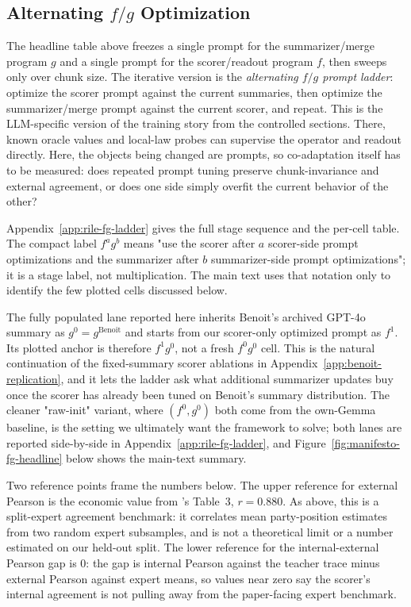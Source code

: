 \subsection[Alternating f/g Optimization]{Alternating $f/g$ Optimization}\label{sec:rile-fg-ladder}

The headline table above freezes a single prompt for the summarizer/merge
program $g$ and a single prompt for the scorer/readout program $f$, then
sweeps only over chunk size. The iterative version is the
\emph{alternating $f/g$ prompt ladder}: optimize the scorer prompt against
the current summaries, then optimize the summarizer/merge prompt against
the current scorer, and repeat. This is the LLM-specific version of the
training story from the controlled sections. There, known oracle values
and local-law probes can supervise the operator and readout directly.
Here, the objects being changed are prompts, so co-adaptation itself has
to be measured: does repeated prompt tuning preserve chunk-invariance and
external agreement, or does one side simply overfit the current behavior
of the other?

Appendix~\ref{app:rile-fg-ladder} gives the full stage sequence and the
per-cell table. The compact label $f^a g^b$ means "use the scorer after
$a$ scorer-side prompt optimizations and the summarizer after $b$
summarizer-side prompt optimizations"; it is a stage label, not
multiplication. The main text uses that notation only to identify the
few plotted cells discussed below.

The fully populated lane reported here inherits Benoit's archived
GPT-4o summary as $g^0 = g^{\mathrm{Benoit}}$ and starts from our
scorer-only optimized prompt as $f^1$. Its plotted anchor is therefore
$f^1 g^0$, not a fresh $f^0 g^0$ cell. This is the natural continuation
of the fixed-summary scorer ablations in Appendix~\ref{app:benoit-replication},
and it lets the ladder ask what additional summarizer updates buy once
the scorer has already been tuned on Benoit's summary distribution. The
cleaner "raw-init" variant, where $(f^0, g^0)$ both come from the
own-Gemma baseline, is the setting we ultimately want the framework to
solve; both lanes are reported side-by-side in
Appendix~\ref{app:rile-fg-ladder}, and
Figure~\ref{fig:manifesto-fg-headline} below shows the main-text summary.

Two reference points frame the numbers below. The upper reference for
external Pearson is the economic value from \citet{BenoitEtAl2025}'s
Table~3, $r = 0.880$. As above, this is a split-expert agreement
benchmark: it correlates mean party-position estimates from two random
expert subsamples, and is not a theoretical limit or a number
estimated on our held-out split. The lower reference for the
internal-external Pearson gap is $0$: the gap is internal Pearson
against the teacher trace minus external Pearson against expert means,
so values near zero say the scorer's internal agreement is not pulling
away from the paper-facing expert benchmark.

